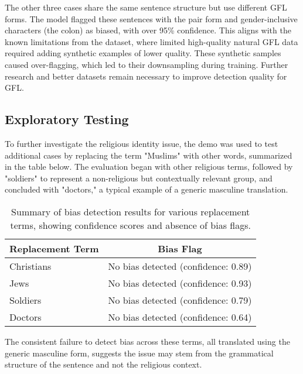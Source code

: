     The other three cases share the same sentence structure but use different GFL forms. The model flagged these sentences with the pair form and gender-inclusive characters (the colon) as biased, with over 95\% confidence. This aligns with the known limitations from the dataset, where limited high-quality natural GFL data required adding synthetic examples of lower quality. These synthetic samples caused over-flagging, which led to their downsampling during training. Further research and better datasets remain necessary to improve detection quality for GFL.

    \subsection{Exploratory Testing}

    To further investigate the religious identity issue, the demo was used to test additional cases by replacing the term "Muslims" with other words, summarized in the table below. The evaluation began with other religious terms, followed by "soldiers" to represent a non-religious but contextually relevant group, and concluded with "doctors," a typical example of a generic masculine translation.

        \vspace{0.8em}
        \begin{table}[H]
            \centering
            \begin{tabular}{lc}
            \toprule
            \textbf{Replacement Term} & \textbf{Bias Flag} \\
            \midrule
            Christians & No bias detected (confidence: 0.89) \\
            Jews & No bias detected (confidence: 0.93) \\
            Soldiers & No bias detected (confidence: 0.79) \\
            Doctors & No bias detected (confidence: 0.64) \\
            \bottomrule
            \end{tabular}
            \caption[Bias detection for replacement terms testing religious identity misclassification]{Summary of bias detection results for various replacement terms, showing confidence scores and absence of bias flags.}
        \end{table}
    
    The consistent failure to detect bias across these terms, all translated using the generic masculine form, suggests the issue may stem from the grammatical structure of the sentence and not the religious context. 

